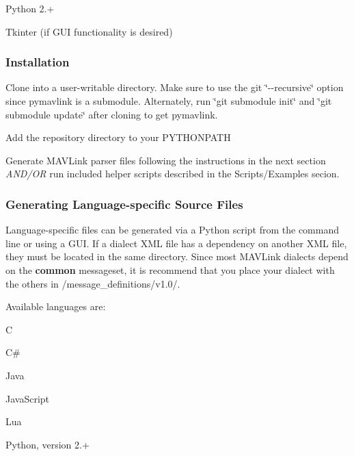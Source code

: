 \begin{DoxyItemize}
\item Python 2.+
\begin{DoxyItemize}
\item Tkinter (if G\+UI functionality is desired)
\end{DoxyItemize}
\end{DoxyItemize}

\subsubsection*{Installation}


\begin{DoxyEnumerate}
\item Clone into a user-\/writable directory. Make sure to use the git \char`\"{}-\/-\/recursive\char`\"{} option since pymavlink is a submodule. Alternately, run \char`\"{}git submodule init\char`\"{} and \char`\"{}git submodule update\char`\"{} after cloning to get pymavlink.
\item Add the repository directory to your {\ttfamily P\+Y\+T\+H\+O\+N\+P\+A\+TH}
\item Generate M\+A\+V\+Link parser files following the instructions in the next section {\itshape A\+N\+D/\+OR} run included helper scripts described in the Scripts/\+Examples secion.
\end{DoxyEnumerate}

\subsubsection*{Generating Language-\/specific Source Files}

Language-\/specific files can be generated via a Python script from the command line or using a G\+UI. If a dialect X\+ML file has a dependency on another X\+ML file, they must be located in the same directory. Since most M\+A\+V\+Link dialects depend on the {\bfseries common} messageset, it is recommend that you place your dialect with the others in {\ttfamily /message\+\_\+definitions/v1.0/}.

Available languages are\+:


\begin{DoxyItemize}
\item C
\item C\#
\item Java
\item Java\+Script
\item Lua
\item Python, version 2.+
\end{DoxyItemize}

